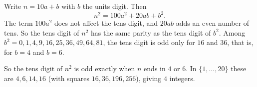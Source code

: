 Write $n=10a+b$ with $b$ the units digit. Then
\[
n^2=100a^2+20ab+b^2 .
\]
The term $100a^2$ does not affect the tens digit, and $20ab$ adds an even number of tens. So the tens digit of $n^2$ has the same parity as the tens digit of $b^2$. Among $b^2=0,1,4,9,16,25,36,49,64,81$, the tens digit is odd only for $16$ and $36$, that is, for $b=4$ and $b=6$.

So the tens digit of $n^2$ is odd exactly when $n$ ends in $4$ or $6$. In $\{1,\dots,20\}$ these are $4,6,14,16$ (with squares $16,36,196,256$), giving $\boxed{4}$ integers.
